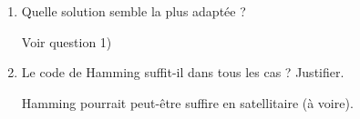 \documentclass{article}
\begin{document}
\begin{enumerate}
	La SSD est fortement impacté par la latence. Le CAN a besoin de robustesse, on néglige à la fois la latence et l'impact de la retransmission sur le débit. Sur les satellites ça dépend mais la robustesse et la latence est importante. L'énergie l'est aussi donc on va avoir tendance à minimiser le nombre de transmission depuis les satellites et donc assurer la redondance sur le premier coup.

\item Quelle solution semble la plus adaptée ?

	Voir question 1)
\item Le code de Hamming suffit-il dans tous les cas ? Justifier. 

Hamming pourrait peut-être suffire en satellitaire (à voire).
\end{enumerate}
\end{document}
